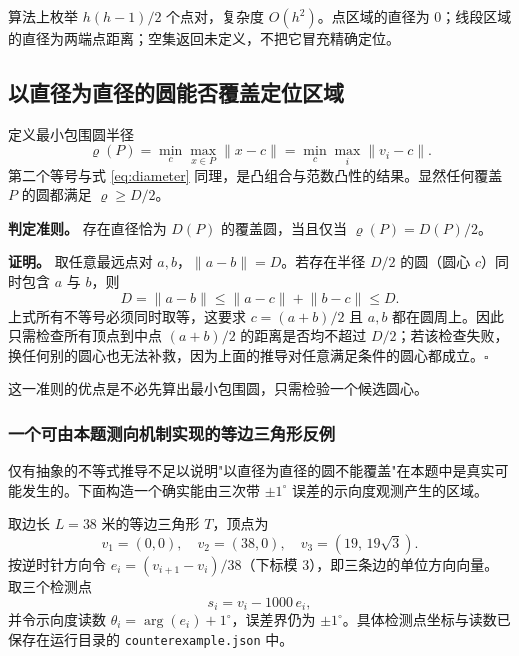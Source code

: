 算法上枚举 $h(h-1)/2$ 个点对，复杂度 $O(h^2)$。点区域的直径为 0；线段区域的直径为两端点距离；空集返回未定义，不把它冒充精确定位。

\subsection{以直径为直径的圆能否覆盖定位区域}

定义最小包围圆半径
\begin{equation}
  \varrho(P)=\min_c\max_{x\in P}\lVert x-c\rVert
  =\min_c\max_i\lVert v_i-c\rVert .
  \label{eq:mincircle}
\end{equation}
第二个等号与式 \eqref{eq:diameter} 同理，是凸组合与范数凸性的结果。显然任何覆盖 $P$ 的圆都满足 $\varrho\ge D/2$。

\textbf{判定准则。} 存在直径恰为 $D(P)$ 的覆盖圆，当且仅当 $\varrho(P)=D(P)/2$。

\textbf{证明。} 取任意最远点对 $a,b$，$\lVert a-b\rVert=D$。若存在半径 $D/2$ 的圆（圆心 $c$）同时包含 $a$ 与 $b$，则
\begin{equation}
  D=\lVert a-b\rVert\le\lVert a-c\rVert+\lVert b-c\rVert\le D .
\end{equation}
上式所有不等号必须同时取等，这要求 $c=(a+b)/2$ 且 $a,b$ 都在圆周上。因此只需检查所有顶点到中点 $(a+b)/2$ 的距离是否均不超过 $D/2$；若该检查失败，换任何别的圆心也无法补救，因为上面的推导对任意满足条件的圆心都成立。$\square$

这一准则的优点是不必先算出最小包围圆，只需检验一个候选圆心。

\subsubsection{一个可由本题测向机制实现的等边三角形反例}

仅有抽象的不等式推导不足以说明"以直径为直径的圆不能覆盖"在本题中是真实可能发生的。下面构造一个确实能由三次带 $\pm1^\circ$ 误差的示向度观测产生的区域。

取边长 $L=38$ 米的等边三角形 $T$，顶点为
\begin{equation}
  v_1=(0,0),\quad v_2=(38,0),\quad v_3=(19,\,19\sqrt3).
\end{equation}
按逆时针方向令 $e_i=(v_{i+1}-v_i)/38$（下标模 3），即三条边的单位方向向量。取三个检测点
\begin{equation}
  s_i=v_i-1000\,e_i,
\end{equation}
并令示向度读数 $\theta_i=\arg(e_i)+1^\circ$，误差界仍为 $\pm1^\circ$。具体检测点坐标与读数已保存在运行目录的 \texttt{counterexample.json} 中。

